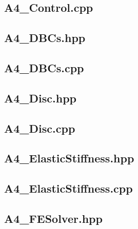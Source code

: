 \documentclass[a4paper, 12pt]{article}
\begin{document}
\subsection{A4\_Control.cpp} \label{subsec:Cont.cpp}


\subsection{A4\_DBCs.hpp} \label{subsec:DBCs.hpp}


\subsection{A4\_DBCs.cpp} \label{subsec:DBCs.cpp}


\subsection{A4\_Disc.hpp} \label{subsec:Disc.hpp}


\subsection{A4\_Disc.cpp} \label{subsec:Disc.cpp}


\subsection{A4\_ElasticStiffness.hpp} \label{subsec:ElasticStiffness.hpp}


\subsection{A4\_ElasticStiffness.cpp} \label{subsec:ElasticStiffness.cpp}


\subsection{A4\_FESolver.hpp} \label{subsec:FESolver.hpp}

\end{document}
